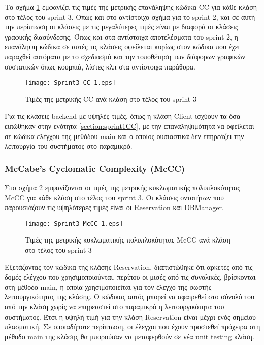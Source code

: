 Το σχήμα \ref{fig:sprint3CC} εμφανίζει τις τιμές της μετρικής επανάληψης
κώδικα CC για κάθε κλάση στο τέλος του sprint 3. Όπως και στο αντίστοιχο
σχήμα για το sprint 2, και σε αυτή την περίπτωση οι κλάσεις με τις
μεγαλύτερες τιμές είναι με διαφορά οι κλάσεις γραφικής διασύνδεσης. Όπως
και στα αντίστοιχα αποτελέσματα του sprint 2, η επανάληψη κώδικα σε
αυτές τις κλάσεις οφείλεται κυρίως στον κώδικα που έχει παραχθεί
αυτόματα με το σχεδιασμό και την τοποθέτηση των διάφορων γραφικών
συστατικών όπως κουμπιά, λίστες κλπ στα αντίστοιχα παράθυρα.

\begin{figure}
\centering
\texttt{[image: Sprint3-CC-1.eps]}
\caption{Τιμές της μετρικής CC ανά κλάση στο τέλος του sprint 3}
\label{fig:sprint3CC}
\end{figure}

Για τις κλάσεις backend με υψηλές τιμές, όπως η κλάση Client ισχύουν τα
όσα ειπώθηκαν στην ενότητα \ref{section:sprint1CC}, με την
επαναληψιμότητα να οφείλεται σε κώδικα ελέγχου της μεθόδου main και ο
οποίος ουσιαστικά δεν επηρεάζει την λειτουργία του συστήματος στο
παραμικρό.

\subsubsection{McCabe's Cyclomatic Complexity (McCC)}
\label{section:sprint3McCC}

Στο σχήμα \ref{fig:sprint3McCC} εμφανίζονται οι τιμές της μετρικής
κυκλωματικής πολυπλοκότητας McCC για κάθε κλάση στο τέλος του sprint 3.
Οι κλάσεις οντοτήτων που παρουσιάζουν τις υψηλότερες τιμές είναι οι
Reservation και DBManager.

\begin{figure}
\centering
\texttt{[image: Sprint3-McCC-1.eps]}
\caption{Τιμές της μετρικής κυκλωματικής πολυπλοκότητας McCC ανά κλάση στο τέλος του sprint 3}
\label{fig:sprint3McCC}
\end{figure}

Εξετάζοντας τον κώδικα της κλάσης Reservation, διαπιστώθηκε ότι αρκετές
από τις δομές ελέγχου που χρησιμοποιούνται, περίπου οι μισές από τις
συνολικές, βρίσκονται στη μέθοδο main,
η οποία χρησιμοποιείται για τον έλεγχο της σωστής λειτουργικότητας της
κλάσης. Ο κώδικας αυτός μπορεί να αφαιρεθεί στο σύνολό του από την
κλάση χωρίς να επηρεαστεί στο παραμικρό η λειτουργικότητα του
συστήματος. Έτσι η υψηλή τιμή για την κλάση Reservation είναι μέχρι ενός
σημείου πλασματική. Σε οποιαδήποτε περίπτωση, οι έλεγχοι που έχουν
προστεθεί πρόχειρα στη μέθοδο main της κλάσης θα μπορούσαν να
μεταφερθούν σε νέα unit testing κλάση.

